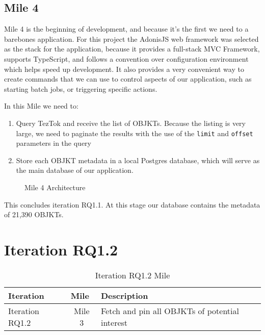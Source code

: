 \subsection {Mile 4}

Mile 4 is the beginning of development, and because it's the first we need to a barebones application. For this project the AdonisJS web framework was selected as the stack for the application, because it provides a full-stack MVC Framework, supports TypeScript, and follows a convention over configuration environment which helps speed up development. It also provides a very convenient way to create  commands that we can use to control aspects of our application, such as starting batch jobs, or triggering specific actions.

In this Mile we need to:

\begin{enumerate}
	\item Query TezTok and receive the list of OBJKTs. Because the listing is very large, we need to paginate the results with the use of the \texttt{limit} and \texttt{offset} parameters in the query
	\item Store each OBJKT metadata in a local Postgres database, which will serve as the main database of our application.
\end{enumerate}



\begin{figure}[h]
    \centering
    
    \caption[Mile 4 Architecture]{Mile 4 Architecture}
    \label{fig:mile4-arch}
\end{figure}


This concludes iteration RQ1.1. At this stage our database contains the metadata of 21,390 OBJKTs.


\section {Iteration RQ1.2}
\label{sec:rq1.2}

\begin{table}[h]
\footnotesize
\centering
\begin{tabular}{|l|c|l|}
\hline
\textbf{Iteration}        & \multicolumn{1}{l|}{\textbf{Mile}} & \textbf{Description}                                         \\ \hline
Iteration RQ1.2                  & Mile 3                              & Fetch and pin all OBJKTs of potential interest               \\ \hline
\end{tabular}
\caption{Iteration RQ1.2 Mile}
\end{table}


